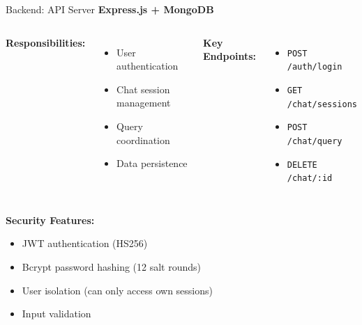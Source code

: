 \documentclass[11pt,aspectratio=16:9]{beamer}
\begin{document}
\begin{frame}{Backend: API Server}
    \textbf{Express.js + MongoDB}
    
    \begin{columns}
        \textbf{Responsibilities:}
        \begin{itemize}
            \item User authentication
            \item Chat session management
            \item Query coordination
            \item Data persistence
        \end{itemize}
        
        \textbf{Key Endpoints:}
        \begin{itemize}
            \item \texttt{POST /auth/login}
            \item \texttt{GET /chat/sessions}
            \item \texttt{POST /chat/query}
            \item \texttt{DELETE /chat/:id}
        \end{itemize}
    \end{columns}
    
    \vspace{0.5cm}
    
    \begin{center}
        \textbf{Security Features:}
        \begin{itemize}
            \item JWT authentication (HS256)
            \item Bcrypt password hashing (12 salt rounds)
            \item User isolation (can only access own sessions)
            \item Input validation
        \end{itemize}
    \end{center}
\end{frame}
\end{document}
